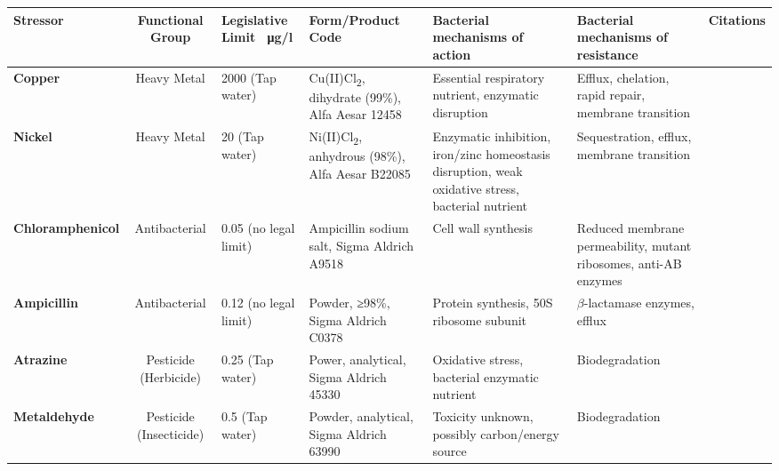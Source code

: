 \documentclass[review,12pt]{elsarticle}
\begin{document}

\begin{landscape}
\begin{table}[ht]
\tiny
\setlength{\tabcolsep}{4pt}
\setlength{\extrarowheight}{3pt}
\begin{tabular}{l c L L M L L}
\toprule
\textbf{Stressor} & \textbf{Functional Group} & \textbf{Legislative Limit \SI{}{\ug}/l} & \textbf{Form/Product Code} & \textbf{Bacterial mechanisms of action} & \textbf{Bacterial mechanisms of resistance} & \textbf{Citations} \\
\midrule
{}\textbf{Copper} & Heavy Metal & 2000 (Tap water) & Cu(II)Cl\textsubscript{2}, dihydrate (99\%), Alfa Aesar 12458 & Essential respiratory nutrient, enzymatic disruption & Efflux, chelation, rapid repair, membrane transition & \cite{Nayar2004EnvironmentalMesocosms,Valko2005MetalsStress,Dupont2011CopperApplications,ECHA2018REACHCopper} \\
\textbf{Nickel} & Heavy Metal & 20 (Tap water) & Ni(II)Cl\textsubscript{2}, anhydrous (98\%), Alfa Aesar B22085 & Enzymatic inhibition, iron/zinc homeostasis disruption, weak oxidative stress, bacterial nutrient & Sequestration, efflux, membrane transition & \cite{Nayar2004EnvironmentalMesocosms,Macomber2011,Nishimura1998ProtonCerevisiae,Zamble2015NickelBiology} \\
\textbf{Chloramphenicol} & Antibacterial & 0.05 (no legal limit) & Ampicillin sodium salt, Sigma Aldrich A9518 & Cell wall synthesis & Reduced membrane permeability, mutant ribosomes, anti-AB enzymes & \cite{Shaw1979Primary31,Rebstock1949ChloramphenicolChloromycetin,Toku-E2018ChloramphenicolChloromycetin,Ruiz1999MechanismsFish,Baker-Austin2006Co-selectionResistance} \\
\textbf{Ampicillin} & Antibacterial & 0.12 (no legal limit) & Powder, ≥98\%, Sigma Aldrich C0378 & Protein synthesis, 50S ribosome subunit & $\beta$-lactamase enzymes, efflux & \cite{Ruiz1999MechanismsFish,Costanzo2005EcosystemEnvironment} \\
\textbf{Atrazine} & Pesticide (Herbicide) & 0.25 (Tap water) & Power, analytical, Sigma Aldrich 45330 & Oxidative stress, bacterial enzymatic nutrient & Biodegradation & \cite{Shimabukuro1969AtrazineAction,Delorenzo2001TOXICITYREVIEW,Zhang2012OxidativeAtrazine} \\
\textbf{Metaldehyde} & Pesticide (Insecticide) & 0.5 (Tap water) & Powder, analytical, Sigma Aldrich 63990 & Toxicity unknown, possibly carbon/energy source & Biodegradation & \cite{Kay2014UsingProblem,Castle2017,Thomas2017IsolationSoils} \\

\end{tabular}
\end{table}
\end{landscape}
\end{document}

